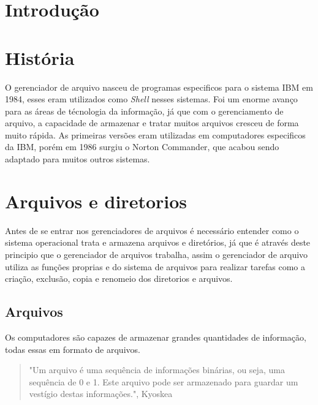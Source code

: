 \documentclass[12pt,a4paper,openany,oneside]{abntex2}
\begin{document}
\imprimircapa

\imprimirfolhaderosto
{}
\tableofcontents

\maketitle

\section{Introdução}



\section{História}

O gerenciador de arquivo nasceu de programas especificos para o sistema IBM em 1984, esses eram utilizados como \textit{Shell} nesses sistemas. Foi um enorme avanço para as áreas de técnologia da informação, já que com o gerenciamento de arquivo, a capacidade de armazenar e tratar muitos arquivos cresceu de forma muito rápida. As primeiras versões eram utilizadas em computadores especificos da IBM, porém em 1986 surgiu o Norton Commander, que acabou sendo adaptado para muitos outros sistemas.

\section{Arquivos e diretorios}

Antes de se entrar nos gerenciadores de arquivos é necessário entender como o sistema operacional trata e armazena arquivos e diretórios, já que é através deste principio que o gerenciador de arquivos trabalha, assim o gerenciador de arquivo utiliza as funções proprias e do sistema de arquivos para realizar tarefas como a criação, exclusão, copia e renomeio dos diretorios e arquivos.

\subsection{Arquivos}

Os computadores são capazes de armazenar grandes quantidades de informação, todas essas em formato de arquivos.

 \begin{quote}
"Um arquivo é uma sequência de informações binárias, ou seja, uma sequência de 0 e 1. Este arquivo pode ser armazenado para guardar um vestígio destas informações.", Kyoskea
\end{quote}
\end{document}

